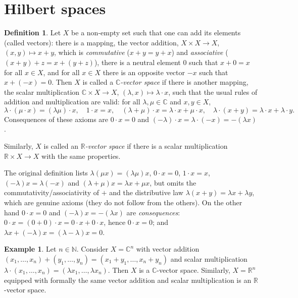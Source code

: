 \documentclass[11pt,a4paper]{article}
\numberwithin{equation}{section}
\newcommand{\N}{\mathbb{N}}
\newcommand{\R}{\mathbb{R}}
\newcommand{\C}{\mathbb{C}}
\theoremstyle{plain}
\theoremstyle{definition}
\newtheorem{definition}[theorem]{Definition}
\newtheorem{example}[theorem]{Example}
\theoremstyle{plain}
\theoremstyle{definition}
\begin{document}
\section{Hilbert spaces}

\begin{definition}\label{def:vs}
Let $X$ be a non-empty set such that one can add its elements (called vectors): there is
a mapping, the vector addition, $X\times X\to X$, $(x,y)\mapsto x+y$, which is
\emph{commutative} ($x+y=y+x$) and \emph{associative} ($(x+y)+z=x+(y+z)$), there is a
neutral element $0$ such that $x+0=x$ for all $x\in X$, and for all $x\in X$ there is an
opposite vector $-x$ such that $x+(-x)=0$. Then $X$ is called a \emph{$\C$-vector space}
if there is another mapping, the scalar multiplication $\C\times X\to X$,
$(\lambda,x)\mapsto\lambda\cdot x$, such that the usual rules of addition and
multiplication are valid: for all $\lambda,\mu\in\C$ and $x,y\in X$,
\[
\lambda\cdot(\mu\cdot x)=(\lambda\mu)\cdot x,\quad 1\cdot x=x,\quad
(\lambda+\mu)\cdot x=\lambda\cdot x+\mu\cdot x,\quad
\lambda\cdot(x+y)=\lambda\cdot x+\lambda\cdot y .
\]
Consequences of these axioms are $0\cdot x=0$ and $(-\lambda)\cdot x=\lambda\cdot(-x)=-(\lambda x)$.

Similarly, $X$ is called an \emph{$\R$-vector space} if there is a scalar multiplication
$\R\times X\to X$ with the same properties.
\end{definition}

\begin{correction}[(Def.~1.1)]
The original definition lists $\lambda(\mu x)=(\lambda\mu)x$, $0\cdot x=0$, $1\cdot x=x$,
$(-\lambda)x=\lambda(-x)$ and $(\lambda+\mu)x=\lambda x+\mu x$, but omits the
commutativity/associativity of $+$ and the distributive law
$\lambda(x+y)=\lambda x+\lambda y$, which are genuine axioms (they do not follow from the
others). On the other hand $0\cdot x=0$ and $(-\lambda)x=-(\lambda x)$ are
\emph{consequences}: $0\cdot x=(0+0)\cdot x=0\cdot x+0\cdot x$, hence $0\cdot x=0$; and
$\lambda x+(-\lambda)x=(\lambda-\lambda)x=0$.
\end{correction}

\begin{example}
Let $n\in\N$. Consider $X=\C^n$ with vector addition
$(x_1,\dots,x_n)+(y_1,\dots,y_n)=(x_1+y_1,\dots,x_n+y_n)$ and scalar multiplication
$\lambda\cdot(x_1,\dots,x_n)=(\lambda x_1,\dots,\lambda x_n)$. Then $X$ is a $\C$-vector
space. Similarly, $X=\R^n$ equipped with formally the same vector addition and scalar
multiplication is an $\R$-vector space.
\end{example}
\end{document}
